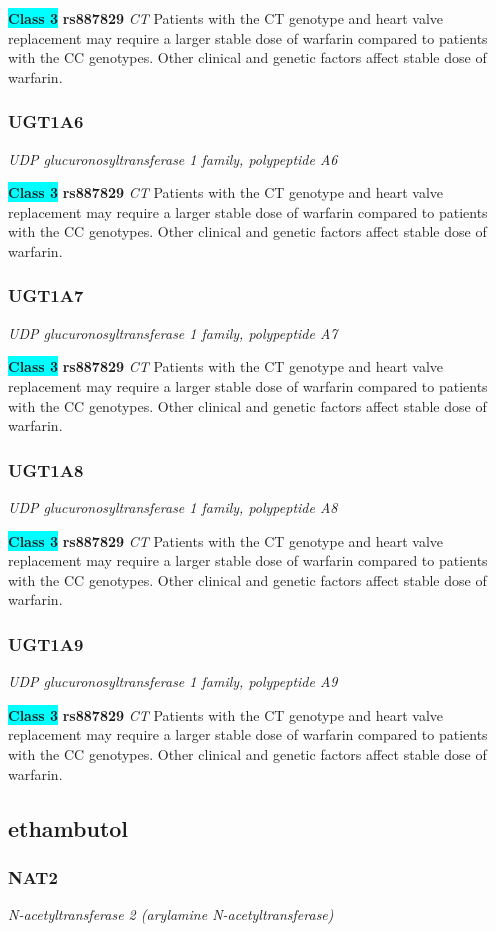 \documentclass{report}
\begin{document}
\textbf{\colorbox{cyan} {Class 3}} \textbf{ rs887829 } \textit{ CT }
Patients with the CT genotype and heart valve replacement may require a larger stable dose of warfarin compared to patients with the CC genotypes. Other clinical and genetic factors affect stable dose of warfarin.\newline\subsubsection{ UGT1A6 }
\textit{ UDP glucuronosyltransferase 1 family, polypeptide A6 }

\textbf{\colorbox{cyan} {Class 3}} \textbf{ rs887829 } \textit{ CT }
Patients with the CT genotype and heart valve replacement may require a larger stable dose of warfarin compared to patients with the CC genotypes. Other clinical and genetic factors affect stable dose of warfarin.\newline\subsubsection{ UGT1A7 }
\textit{ UDP glucuronosyltransferase 1 family, polypeptide A7 }

\textbf{\colorbox{cyan} {Class 3}} \textbf{ rs887829 } \textit{ CT }
Patients with the CT genotype and heart valve replacement may require a larger stable dose of warfarin compared to patients with the CC genotypes. Other clinical and genetic factors affect stable dose of warfarin.\newline\subsubsection{ UGT1A8 }
\textit{ UDP glucuronosyltransferase 1 family, polypeptide A8 }

\textbf{\colorbox{cyan} {Class 3}} \textbf{ rs887829 } \textit{ CT }
Patients with the CT genotype and heart valve replacement may require a larger stable dose of warfarin compared to patients with the CC genotypes. Other clinical and genetic factors affect stable dose of warfarin.\newline\subsubsection{ UGT1A9 }
\textit{ UDP glucuronosyltransferase 1 family, polypeptide A9 }

\textbf{\colorbox{cyan} {Class 3}} \textbf{ rs887829 } \textit{ CT }
Patients with the CT genotype and heart valve replacement may require a larger stable dose of warfarin compared to patients with the CC genotypes. Other clinical and genetic factors affect stable dose of warfarin.\newline\subsection{ ethambutol }\subsubsection{ NAT2 }
\textit{ N-acetyltransferase 2 (arylamine N-acetyltransferase) }
\end{document}
